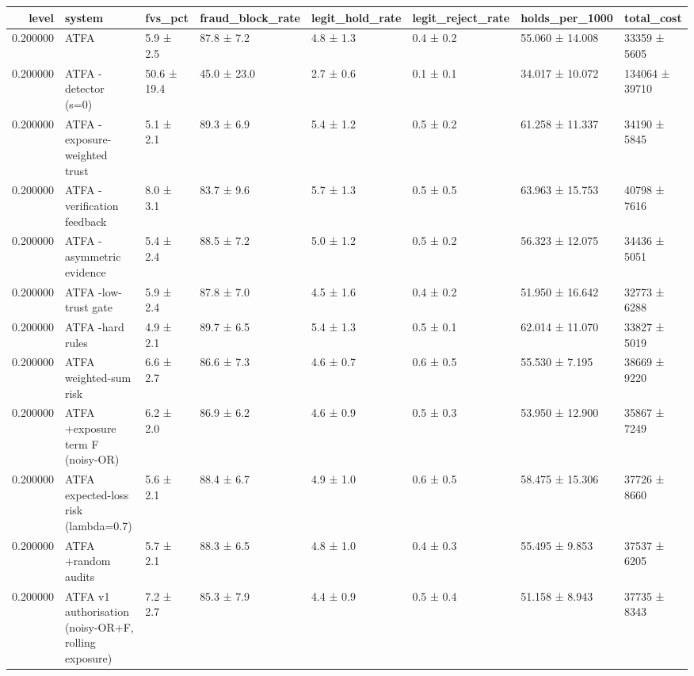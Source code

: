 \begin{tabular}{rlllllll}
\toprule
level & system & fvs\_pct & fraud\_block\_rate & legit\_hold\_rate & legit\_reject\_rate & holds\_per\_1000 & total\_cost \\
\midrule
0.200000 & ATFA & 5.9 ± 2.5 & 87.8 ± 7.2 & 4.8 ± 1.3 & 0.4 ± 0.2 & 55.060 ± 14.008 & 33359 ± 5605 \\
0.200000 & ATFA -detector (s=0) & 50.6 ± 19.4 & 45.0 ± 23.0 & 2.7 ± 0.6 & 0.1 ± 0.1 & 34.017 ± 10.072 & 134064 ± 39710 \\
0.200000 & ATFA -exposure-weighted trust & 5.1 ± 2.1 & 89.3 ± 6.9 & 5.4 ± 1.2 & 0.5 ± 0.2 & 61.258 ± 11.337 & 34190 ± 5845 \\
0.200000 & ATFA -verification feedback & 8.0 ± 3.1 & 83.7 ± 9.6 & 5.7 ± 1.3 & 0.5 ± 0.5 & 63.963 ± 15.753 & 40798 ± 7616 \\
0.200000 & ATFA -asymmetric evidence & 5.4 ± 2.4 & 88.5 ± 7.2 & 5.0 ± 1.2 & 0.5 ± 0.2 & 56.323 ± 12.075 & 34436 ± 5051 \\
0.200000 & ATFA -low-trust gate & 5.9 ± 2.4 & 87.8 ± 7.0 & 4.5 ± 1.6 & 0.4 ± 0.2 & 51.950 ± 16.642 & 32773 ± 6288 \\
0.200000 & ATFA -hard rules & 4.9 ± 2.1 & 89.7 ± 6.5 & 5.4 ± 1.3 & 0.5 ± 0.1 & 62.014 ± 11.070 & 33827 ± 5019 \\
0.200000 & ATFA weighted-sum risk & 6.6 ± 2.7 & 86.6 ± 7.3 & 4.6 ± 0.7 & 0.6 ± 0.5 & 55.530 ± 7.195 & 38669 ± 9220 \\
0.200000 & ATFA +exposure term F (noisy-OR) & 6.2 ± 2.0 & 86.9 ± 6.2 & 4.6 ± 0.9 & 0.5 ± 0.3 & 53.950 ± 12.900 & 35867 ± 7249 \\
0.200000 & ATFA expected-loss risk (lambda=0.7) & 5.6 ± 2.1 & 88.4 ± 6.7 & 4.9 ± 1.0 & 0.6 ± 0.5 & 58.475 ± 15.306 & 37726 ± 8660 \\
0.200000 & ATFA +random audits & 5.7 ± 2.1 & 88.3 ± 6.5 & 4.8 ± 1.0 & 0.4 ± 0.3 & 55.495 ± 9.853 & 37537 ± 6205 \\
0.200000 & ATFA v1 authorisation (noisy-OR+F, rolling exposure) & 7.2 ± 2.7 & 85.3 ± 7.9 & 4.4 ± 0.9 & 0.5 ± 0.4 & 51.158 ± 8.943 & 37735 ± 8343 \\
\bottomrule
\end{tabular}
